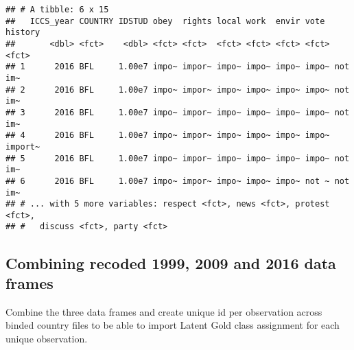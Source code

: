 \documentclass[]{article}
\newenvironment{Shaded}{\begin{snugshade}}{\end{snugshade}}
\newcommand{\DataTypeTok}[1]{\textcolor[rgb]{0.13,0.29,0.53}{#1}}
\newcommand{\KeywordTok}[1]{\textcolor[rgb]{0.13,0.29,0.53}{\textbf{#1}}}
\newcommand{\NormalTok}[1]{#1}
\newcommand{\OperatorTok}[1]{\textcolor[rgb]{0.81,0.36,0.00}{\textbf{#1}}}
\newcommand{\StringTok}[1]{\textcolor[rgb]{0.31,0.60,0.02}{#1}}
\begin{document}
\begin{Shaded}
\end{Shaded}

\begin{verbatim}
## # A tibble: 6 x 15
##   ICCS_year COUNTRY IDSTUD obey  rights local work  envir vote  history
##       <dbl> <fct>    <dbl> <fct> <fct>  <fct> <fct> <fct> <fct> <fct>  
## 1      2016 BFL     1.00e7 impo~ impor~ impo~ impo~ impo~ impo~ not im~
## 2      2016 BFL     1.00e7 impo~ impor~ impo~ impo~ impo~ impo~ not im~
## 3      2016 BFL     1.00e7 impo~ impor~ impo~ impo~ impo~ impo~ not im~
## 4      2016 BFL     1.00e7 impo~ impor~ impo~ impo~ impo~ impo~ import~
## 5      2016 BFL     1.00e7 impo~ impor~ impo~ impo~ impo~ impo~ not im~
## 6      2016 BFL     1.00e7 impo~ impor~ impo~ impo~ impo~ not ~ not im~
## # ... with 5 more variables: respect <fct>, news <fct>, protest <fct>,
## #   discuss <fct>, party <fct>
\end{verbatim}

\hypertarget{combining-recoded-1999-2009-and-2016-data-frames}{%
\subsection{Combining recoded 1999, 2009 and 2016 data
frames}\label{combining-recoded-1999-2009-and-2016-data-frames}}

Combine the three data frames and create unique id per observation
across binded country files to be able to import Latent Gold class
assignment for each unique observation.
\end{document}
